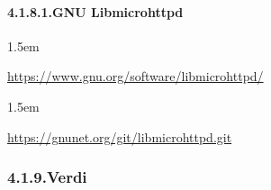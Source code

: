 \documentclass[12pt,twoside]{article}
\begin{document}
\paragraph{4.1.8.1.\hspace*{0.5em}GNU Libmicrohttpd}\label{sec-gnu-libmicrohttpd}%

\begin{mddefinitions}%


\begin{mdbmarginx}{}{}{}{1.5em}%
\begin{mddefdata}%
\href{https://www.gnu.org/software/libmicrohttpd/}{{\ttfamily https://\hspace{0pt}www.\hspace{0pt}gnu.\hspace{0pt}org/\hspace{0pt}software/\hspace{0pt}libmicrohttpd/\hspace{0pt}}}
\end{mddefdata}%
\end{mdbmarginx}%


\begin{mdbmarginx}{}{}{}{1.5em}%
\begin{mddefdata}%
\href{https://gnunet.org/git/libmicrohttpd.git}{{\ttfamily https://\hspace{0pt}gnunet.\hspace{0pt}org/\hspace{0pt}git/\hspace{0pt}libmicrohttpd.\hspace{0pt}git}}%
\end{mddefdata}%
\end{mdbmarginx}%
\end{mddefinitions}%

\subsubsection{4.1.9.\hspace*{0.5em}Verdi}\label{sec-verdi}%
\end{document}
